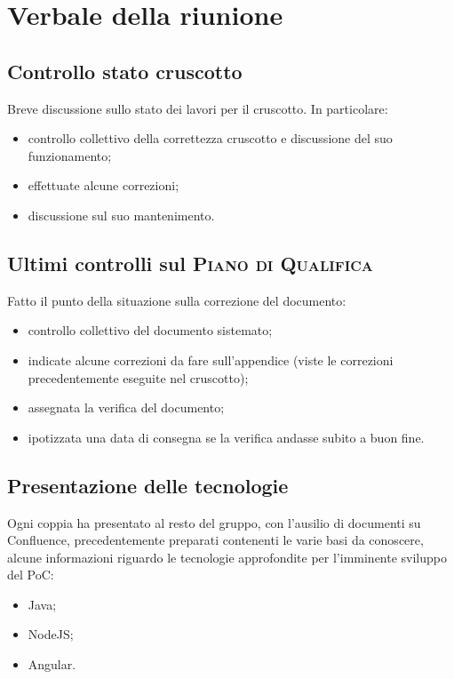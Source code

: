 \section{Verbale della riunione}

\subsection{Controllo stato cruscotto}
Breve discussione sullo stato dei lavori per il cruscotto. In particolare:
    \begin{itemize}
        \item controllo collettivo della correttezza cruscotto e discussione del suo funzionamento;
        \item effettuate alcune correzioni;
        \item discussione sul suo mantenimento.
    \end{itemize}

\subsection{Ultimi controlli sul \textsc{Piano di Qualifica}}
Fatto il punto della situazione sulla correzione del documento:
    \begin{itemize}
   		\item controllo collettivo del documento sistemato;
   		\item indicate alcune correzioni da fare sull'appendice (viste le correzioni precedentemente eseguite nel cruscotto);
		\item assegnata la verifica del documento;
		\item ipotizzata una data di consegna se la verifica andasse subito a buon fine.
	\end{itemize}
	
\subsection{Presentazione delle tecnologie}
Ogni coppia ha presentato al resto del gruppo, con l'ausilio di documenti su Confluence, precedentemente preparati contenenti le varie basi da conoscere, alcune informazioni riguardo le tecnologie approfondite per l'imminente sviluppo del PoC:
    \begin{itemize}
   		\item Java;
   		\item NodeJS;
		\item Angular.
	\end{itemize}
	
